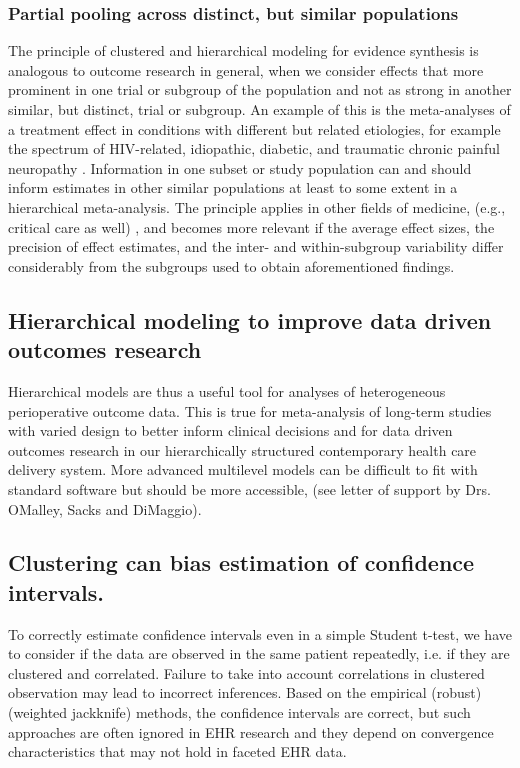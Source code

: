 \documentclass[11pt,notitlepage]{article}
\begin{document}
\subsubsection*{Partial pooling across distinct, but similar populations}
The principle  of clustered and hierarchical modeling for evidence synthesis is analogous to outcome research in general, 
when we consider effects that more prominent in one trial or subgroup of the population and not as strong in another similar, but 
distinct, trial or subgroup. An example of this is the meta-analyses of a treatment effect in conditions with different but 
related etiologies, for example the spectrum of HIV-related, idiopathic, diabetic, and traumatic chronic painful neuropathy 
\cite{Andreae2015}. Information in one subset or study population can and should inform estimates in other similar populations 
at least to some extent in a hierarchical meta-analysis. The principle applies in other fields of medicine, (e.g., critical care 
as well) \cite{Roth2015CriticalCare}, and becomes more relevant if the average effect sizes, the precision of effect 
estimates, and the inter- and within-subgroup variability differ considerably from the subgroups used to obtain 
aforementioned findings.

\subsection*{Hierarchical modeling to improve data driven outcomes research}
 
Hierarchical models are thus a useful tool for analyses of
heterogeneous perioperative outcome data. This is true for meta-analysis 
of long-term studies with varied design to better inform clinical 
decisions\cite{AndreaeJohnsonAbstract2013,Spiegelhalter2004bayesian} and 
for data driven outcomes research  in our hierarchically structured 
contemporary health care delivery system. More advanced multilevel 
models can be difficult to fit with standard software but should be 
more accessible, (see letter of support by Drs. OMalley, Sacks and DiMaggio).

\subsection*{Clustering can bias estimation of confidence intervals.} To 
correctly estimate confidence intervals even in a simple Student t-test, 
we have to consider if the data are observed in the same patient 
repeatedly, i.e. if they are clustered and correlated. Failure to take into 
account correlations in clustered observation may lead to incorrect inferences. 
Based on the empirical (robust) (weighted jackknife) methods, the confidence 
intervals are correct, but such approaches are often ignored in EHR research 
and they depend on convergence characteristics that may not hold in faceted EHR data. 
\end{document}

